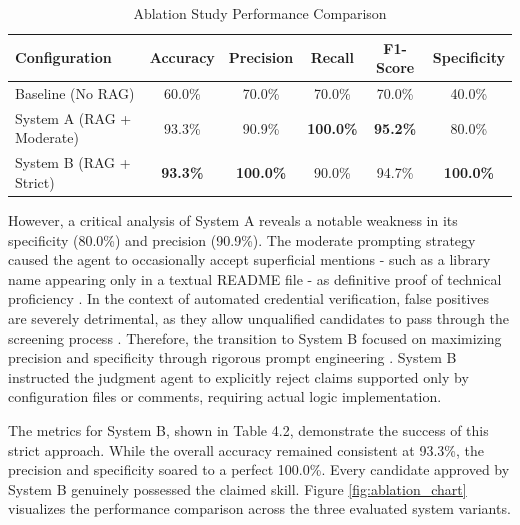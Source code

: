 \begin{table}[htbp]
\setlength{\tabcolsep}{12pt}
\renewcommand{\arraystretch}{1.2}
\setlength{\tabcolsep}{10pt}
\centering
\small
\caption{Ablation Study Performance Comparison}
\label{tab:ablation_study}
\begin{tabularx}{\textwidth}{Xc c c c c}
\toprule
\textbf{Configuration} & \textbf{Accuracy} & \textbf{Precision} & \textbf{Recall} & \textbf{F1-Score} & \textbf{Specificity} \\ \midrule
Baseline (No RAG) & 60.0\% & 70.0\% & 70.0\% & 70.0\% & 40.0\% \\
System A (RAG + Moderate) & 93.3\% & 90.9\% & \textbf{100.0\%} & \textbf{95.2\%} & 80.0\% \\
System B (RAG + Strict) & \textbf{93.3\%} & \textbf{100.0\%} & 90.0\% & 94.7\% & \textbf{100.0\%} \\ \bottomrule
\end{tabularx}
\end{table}

However, a critical analysis of System A reveals a notable weakness in its specificity (80.0\%) and precision (90.9\%). The moderate prompting strategy caused the agent to occasionally accept superficial mentions - such as a library name appearing only in a textual README file - as definitive proof of technical proficiency \cite{ref7, ref62}. In the context of automated credential verification, false positives are severely detrimental, as they allow unqualified candidates to pass through the screening process \cite{ref54}. Therefore, the transition to System B focused on maximizing precision and specificity through rigorous prompt engineering \cite{ref59}. System B instructed the judgment agent to explicitly reject claims supported only by configuration files or comments, requiring actual logic implementation.

The metrics for System B, shown in Table 4.2, demonstrate the success of this strict approach. While the overall accuracy remained consistent at 93.3\%, the precision and specificity soared to a perfect 100.0\%. Every candidate approved by System B genuinely possessed the claimed skill. Figure \ref{fig:ablation_chart} visualizes the performance comparison across the three evaluated system variants.

